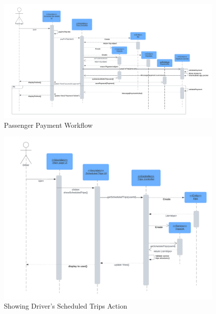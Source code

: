 \documentclass[a4paper, 12pt]{article} %
\begin{document}
        \begin{figure}
            \centering
            \includegraphics[width=\linewidth]{Images/Passenger Payment.png}
            \caption{Passenger Payment Workflow}
            \label{fig:seq_dig_pass_payment}
        \end{figure}


        \begin{figure}
            \centering
            \includegraphics[width=\linewidth]{Images/Driver Scheduled.png}
            \caption{Showing Driver's Scheduled Trips Action}
            \label{fig:seq_dig_driver_scheduled}
        \end{figure}
\end{document}

